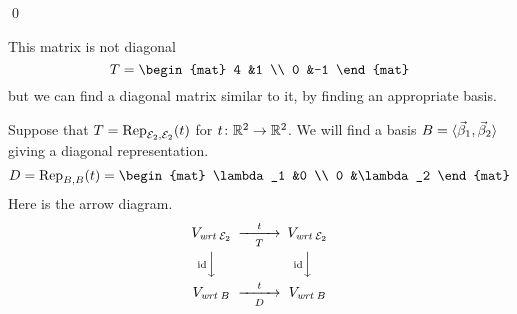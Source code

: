 \documentclass[10pt,t]{beamer}
\begin{document}
\begin{frame}
\lm[lm:DiagIffBasisOfEigens]

\pause
\pf
{}  
\qed
\end{frame}

\begin{frame}
\ex
This matrix is not diagonal
\begin{equation*}
  T=
  \begin{mat}
    4  &1  \\
    0  &-1
  \end{mat}
\end{equation*}
but we can
find a diagonal matrix similar to it, by finding an appropriate basis.

\pause
Suppose that $T=\rep{t}{\stdbasis_2,\stdbasis_2}$ for $\map{t}{\Re^2}{\Re^2}$.
We will find a basis $B=\sequence{\vec{\beta}_1,\vec{\beta}_2}$ giving a 
diagonal representation.
\begin{equation*}
  D=\rep{t}{B,B}=
  \begin{mat}
    \lambda_1  &0 \\
    0    &\lambda_2
  \end{mat}
\end{equation*}
Here is the arrow diagram.
\begin{equation*}
  \begin{CD}
    V_{\wrt{\stdbasis_2}}            @>t>T>        V_{\wrt{\stdbasis_2}}       \\
    @V{\scriptstyle\identity} VV              @V{\scriptstyle\identity} VV \\
    V_{\wrt{B}}                   @>t>D>        V_{\wrt{B}}
  \end{CD}
\end{equation*}
\end{frame}
\end{document}
